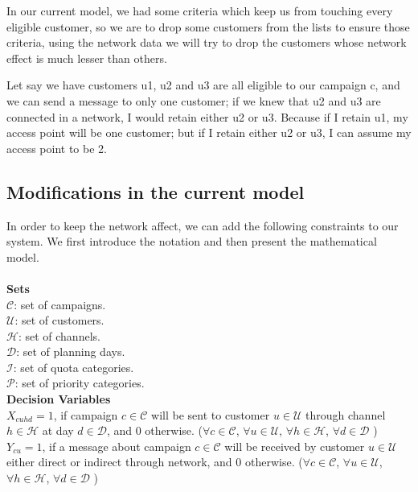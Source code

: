\documentclass[11pt]{article}
\begin{document}
In our current model, we had some criteria which keep us from touching every eligible customer, so we are to drop some customers from the lists to ensure those criteria, using the network data we will try to drop the customers whose network effect is much lesser than others.

Let say we have customers u1, u2 and u3 are all eligible to our campaign c, and we can send a message to only one customer; if we knew that u2 and u3 are connected in a network, I would retain either u2 or u3. Because if I retain u1, my access point will be one customer; but if I retain either u2 or u3, I can assume my access point to be 2.

\subsection{Modifications in the current model} \label{network-modif-model}
In order to keep the network affect, we can add the following constraints to our system. We first introduce the notation and then present the mathematical model.\\
\\
\noindent \textbf{Sets}\\

\noindent ${\mathcal{C}}$: set of campaigns. \\
\noindent ${\mathcal{U}}$: set of customers. \\
\noindent ${\mathcal{H}}$: set of channels. \\
\noindent ${\mathcal{D}}$: set of planning days. \\
\noindent ${\mathcal{I}}$: set of quota categories. \\
\noindent ${\mathcal{P}}$: set of priority categories. \\


\noindent \textbf{Decision Variables}\\

\noindent $X_{{c}{u}{h}{d}}=1$, if campaign $c \in \mathcal{C}$ will be sent to customer $u \in \mathcal{U}$ through channel $h \in \mathcal{H}$ at day $d \in \mathcal{D}$, and 0 otherwise.
($\forall c \in \mathcal{C}$, $\forall u \in \mathcal{U}$, $\forall h \in \mathcal{H}$, $\forall d \in \mathcal{D}$ )\\

\noindent $Y_{{c}{u}}=1$, if a message about campaign $c \in \mathcal{C}$ will be received by customer $u \in \mathcal{U}$ either direct or indirect through network, and 0 otherwise.
($\forall c \in \mathcal{C}$, $\forall u \in \mathcal{U}$, $\forall h \in \mathcal{H}$, $\forall d \in \mathcal{D}$ )\\
\end{document}
